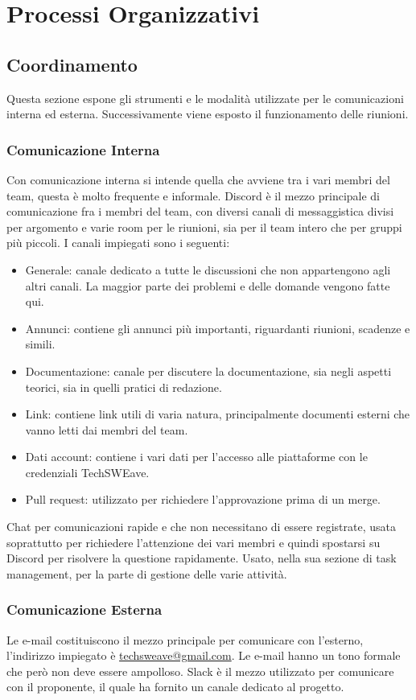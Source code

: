 \section{Processi Organizzativi}
\subsection{Coordinamento}
Questa sezione espone gli strumenti e le modalità utilizzate per le comunicazioni interna ed esterna. Successivamente viene esposto il funzionamento delle riunioni.
\subsubsection{Comunicazione Interna}
Con comunicazione interna si intende quella che avviene tra i vari membri del team, questa è molto frequente e informale.
Discord è il mezzo principale di comunicazione fra i membri del team, con diversi canali di messaggistica divisi per argomento e varie room per le riunioni, sia per il team intero che per gruppi più piccoli.
I canali impiegati sono i seguenti:
\begin{itemize}
    \item Generale: canale dedicato a tutte le discussioni che non appartengono agli altri canali. La maggior parte dei problemi e delle domande vengono fatte qui.
    \item Annunci: contiene gli annunci più importanti, riguardanti riunioni, scadenze e simili.
    \item Documentazione: canale per discutere la documentazione, sia negli aspetti teorici, sia in quelli pratici di redazione.
    \item Link: contiene link utili di varia natura, principalmente documenti esterni che vanno letti dai membri del team.
    \item Dati account: contiene i vari dati per l'accesso alle piattaforme con le credenziali TechSWEave.
    \item Pull request: utilizzato per richiedere l'approvazione prima di un merge.
\end{itemize}
Chat per comunicazioni rapide e che non necessitano di essere registrate, usata soprattutto per richiedere l'attenzione dei vari membri e quindi spostarsi su Discord per risolvere la questione rapidamente.
Usato, nella sua sezione di task management, per la parte di gestione delle varie attività.
\subsubsection{Comunicazione Esterna}
Le e-mail costituiscono il mezzo principale per comunicare con l'esterno, l'indirizzo impiegato è \href{mailto:techsweave@gmail.com}{techsweave@gmail.com}. Le e-mail hanno un tono formale che però non deve essere ampolloso.
Slack è il mezzo utilizzato per comunicare con il proponente, il quale ha fornito un canale dedicato al progetto.
